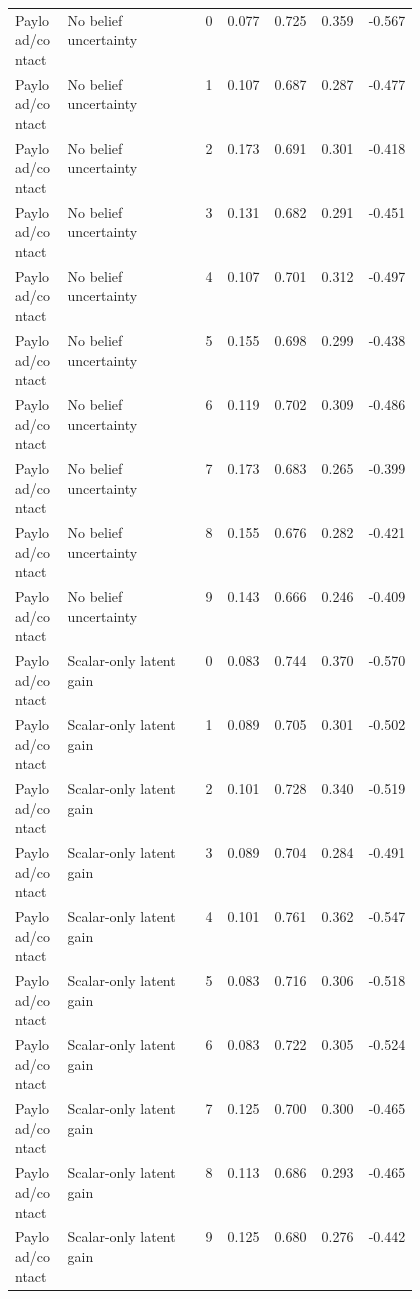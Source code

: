 \documentclass{article}
\begin{document}
\begin{center}
\begin{longtable}{p{0.13\linewidth}p{0.34\linewidth}rrrrr}
Payload/contact & No belief uncertainty & 0 & 0.077 & 0.725 & 0.359 & -0.567\\
Payload/contact & No belief uncertainty & 1 & 0.107 & 0.687 & 0.287 & -0.477\\
Payload/contact & No belief uncertainty & 2 & 0.173 & 0.691 & 0.301 & -0.418\\
Payload/contact & No belief uncertainty & 3 & 0.131 & 0.682 & 0.291 & -0.451\\
Payload/contact & No belief uncertainty & 4 & 0.107 & 0.701 & 0.312 & -0.497\\
Payload/contact & No belief uncertainty & 5 & 0.155 & 0.698 & 0.299 & -0.438\\
Payload/contact & No belief uncertainty & 6 & 0.119 & 0.702 & 0.309 & -0.486\\
Payload/contact & No belief uncertainty & 7 & 0.173 & 0.683 & 0.265 & -0.399\\
Payload/contact & No belief uncertainty & 8 & 0.155 & 0.676 & 0.282 & -0.421\\
Payload/contact & No belief uncertainty & 9 & 0.143 & 0.666 & 0.246 & -0.409\\
Payload/contact & Scalar-only latent gain & 0 & 0.083 & 0.744 & 0.370 & -0.570\\
Payload/contact & Scalar-only latent gain & 1 & 0.089 & 0.705 & 0.301 & -0.502\\
Payload/contact & Scalar-only latent gain & 2 & 0.101 & 0.728 & 0.340 & -0.519\\
Payload/contact & Scalar-only latent gain & 3 & 0.089 & 0.704 & 0.284 & -0.491\\
Payload/contact & Scalar-only latent gain & 4 & 0.101 & 0.761 & 0.362 & -0.547\\
Payload/contact & Scalar-only latent gain & 5 & 0.083 & 0.716 & 0.306 & -0.518\\
Payload/contact & Scalar-only latent gain & 6 & 0.083 & 0.722 & 0.305 & -0.524\\
Payload/contact & Scalar-only latent gain & 7 & 0.125 & 0.700 & 0.300 & -0.465\\
Payload/contact & Scalar-only latent gain & 8 & 0.113 & 0.686 & 0.293 & -0.465\\
Payload/contact & Scalar-only latent gain & 9 & 0.125 & 0.680 & 0.276 & -0.442\\
\bottomrule
\end{longtable}
\normalsize
\end{center}


\end{document}
